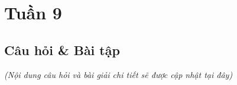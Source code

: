 \section{Tuần 9}
\label{sec:week9}

\subsection{Câu hỏi \& Bài tập}
\textit{(Nội dung câu hỏi và bài giải chi tiết sẽ được cập nhật tại đây)}
